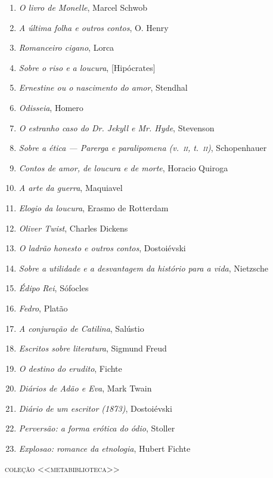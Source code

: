 \begin{enumerate}
\item \textit{O livro de Monelle}, Marcel Schwob
\item \textit{A última folha e outros contos}, O. Henry
\item \textit{Romanceiro cigano}, Lorca
\item \textit{Sobre o riso e a loucura}, [Hipócrates]
\item \textit{Ernestine ou o nascimento do amor}, Stendhal
\item \textit{Odisseia}, Homero
\item \textit{O estranho caso do Dr. Jekyll e Mr. Hyde}, Stevenson
\item \textit{Sobre a ética --- Parerga e paralipomena (v.~\textsc{ii}, t.~\textsc{ii})}, Schopenhauer 
\item \textit{Contos de amor, de loucura e de morte}, Horacio Quiroga
\item \textit{A arte da guerra}, Maquiavel
\item \textit{Elogio da loucura}, Erasmo de Rotterdam
\item \textit{Oliver Twist}, Charles Dickens
\item \textit{O ladrão honesto e outros contos}, Dostoiévski
\item \textit{Sobre a utilidade e a desvantagem da histório para a vida}, Nietzsche
\item \textit{Édipo Rei}, Sófocles
\item \textit{Fedro}, Platão
\item \textit{A conjuração de Catilina}, Salústio
\item \textit{Escritos sobre literatura}, Sigmund Freud
\item \textit{O destino do erudito}, Fichte
\item \textit{Diários de Adão e Eva}, Mark Twain
\item \textit{Diário de um escritor (1873)}, Dostoiévski
\item \textit{Perversão: a forma erótica do ódio}, Stoller
\item \textit{Explosao: romance da etnologia}, Hubert Fichte
\end{enumerate}\medskip

{\large\textsc{coleção <<metabiblioteca>>}}\\

